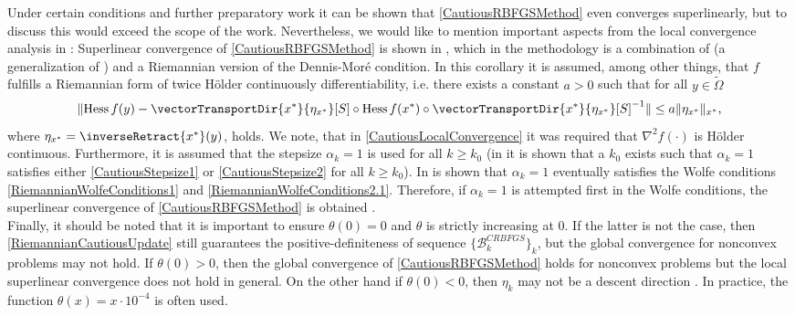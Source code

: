Under certain conditions and further preparatory work it can be shown that \cref{CautiousRBFGSMethod} even converges superlinearly, but to discuss this would exceed the scope of the work. Nevertheless, we would like to mention important aspects from the local convergence analysis in \cite{HuangAbsilGallivan:2018}: Superlinear convergence of \cref{CautiousRBFGSMethod} is shown in \cite[Corollary~5.2.]{HuangAbsilGallivan:2018}, which in the methodology is a combination of \cite[Theorem~5.3.]{HuangAbsilGallivan:2018} (a generalization of \cite[Theorem~3.2]{ByrdNocedal:1989}) and a Riemannian version of the Dennis-Mor\'{e} condition. In this corollary it is assumed, among other things, that $f$ fulfills a Riemannian form of twice Hölder continuously differentiability, i.e. there exists a constant $a > 0$ such that for all $y \in \widetilde{\Omega}$
\begin{equation*}
    \lVert \operatorname{Hess} f(y) - \vectorTransportDir{x^*}{\eta_{x^*}}[S] \circ \operatorname{Hess} f(x^*) \circ {\vectorTransportDir{x^*}{\eta_{x^*}}[S]}^{-1} \rVert \leq a \lVert \eta_{x^*} \rVert_{x^*},
\end{equation*}
where $\eta_{x^*} = \inverseRetract{x^*}(y)$, holds. We note, that in \cref{CautiousLocalConvergence} it was required that $\nabla^2 f(\cdot)$ is Hölder continuous. Furthermore, it is assumed that the stepsize $\alpha_k = 1$ is used for all $k \geq k_0$ (in \cite[Corollary~5.2.]{HuangAbsilGallivan:2018} it is shown that a $k_0$ exists such that $\alpha_k = 1$ satisfies either \cref{CautiousStepsize1} or \cref{CautiousStepsize2} for all $k \geq k_0$). In \cite[Theorem~5.2.4]{Huang:2013} is shown that $\alpha_k = 1$ eventually satisfies the Wolfe conditions \cref{RiemannianWolfeConditions1} and \cref{RiemannianWolfeConditions2.1}. Therefore, if $\alpha_k = 1$ is attempted first in the Wolfe conditions, the superlinear convergence of \cref{CautiousRBFGSMethod} is obtained \cite[p.~286]{HuangAbsilGallivan:2018}. \\
Finally, it should be noted that it is important to ensure $\theta(0) = 0$ and $\theta$ is strictly increasing at $0$. If the latter is not the case, then \cref{RiemannianCautiousUpdate} still guarantees the positive-definiteness of sequence $\{ \mathcal{B}^{CRBFGS}_k \}_k$, but the global convergence for nonconvex problems may not hold. If $\theta(0) > 0$, then the global convergence of \cref{CautiousRBFGSMethod} holds for nonconvex problems but the local superlinear convergence does not hold in general. On the other hand if $\theta(0) < 0$, then $\eta_k$ may not be a descent direction \cite[p.~474]{HuangAbsilGallivan:2018}. In practice, the function $\theta(x) = x \cdot 10^{-4}$ is often used. 
